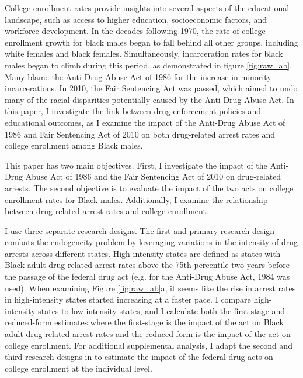 \documentclass{article}
\begin{document}
College enrollment rates provide insights into several aspects of the educational landscape, such as access to higher education, socioeconomic factors, and workforce development. In the decades following 1970, the rate of college enrollment growth for black males began to fall behind all other groups, including white females and black females. Simultaneously, incarceration rates for black males began to climb during this period, as demonstrated in figure \ref{fig:raw_ab}. Many blame the Anti-Drug Abuse Act of 1986 for the increase in minority incarcerations. In 2010, the Fair Sentencing Act was passed, which aimed to undo many of the racial disparities potentially caused by the Anti-Drug Abuse Act. In this paper, I investigate the link between drug enforcement policies and educational outcomes, as I examine the impact of the Anti-Drug Abuse Act of 1986 and Fair Sentencing Act of 2010 on both drug-related arrest rates and college enrollment among Black males.


This paper has two main objectives. First, I investigate the impact of the Anti-Drug Abuse Act of 1986 and the Fair Sentencing Act of 2010 on drug-related arrests. The second objective is to evaluate the impact of the two acts on college enrollment rates for Black males. Additionally, I examine the relationship between drug-related arrest rates and college enrollment. 


I use three separate research designs. The first and primary research design combats the endogeneity problem by leveraging variations in the intensity of drug arrests across different states. High-intensity states are defined as states with Black adult drug-related arrest rates above the 75th percentile two years before the passage of the federal drug act (e.g. for the Anti-Drug Abuse Act, 1984 was used). When examining Figure \ref{fig:raw_ab}a, it seems like the rise in arrest rates in high-intensity states started increasing at a faster pace. I compare high-intensity states to low-intensity states, and I calculate both the first-stage and reduced-form estimates where the first-stage is the impact of the act on Black adult drug-related arrest rates and the reduced-form is the impact of the act on college enrollment. For additional supplemental analysis, I adapt the second and third research designs in \cite{britton2022} to estimate the impact of the federal drug acts on college enrollment at the individual level.
\end{document}
